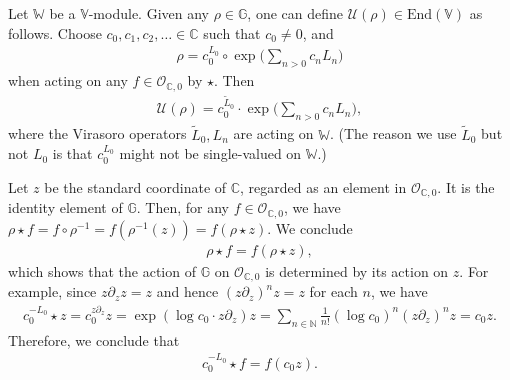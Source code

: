 \documentclass[12pt,b5paper,notitlepage]{report}
\theoremstyle{definition}
\theoremstyle{plain}
\newcommand{\mc}{\mathcal}
\newcommand{\wtd}{\widetilde}
\newcommand{\End}{\mathrm{End}} %
\newcommand{\scr}{\mathscr}
\newcommand{\mbb}{\mathbb}
\newcommand{\blt}{\bullet}
\newcommand{\Vbb}{\mathbb V}
\newcommand{\Wbb}{\mathbb W}
\newcommand{\Gbb}{\mathbb G}
\newcommand{\Cbb}{\mathbb C}
\newcommand{\Nbb}{\mathbb N}
\numberwithin{equation}{section}
\begin{document}
Let $\Wbb$ be a $\Vbb$-module. Given any $\rho\in\Gbb$, one can define $\mc U(\rho)\in\End(\Vbb)$ as follows. \index{U@$\mc U(\rho),\mc U(\eta_\blt)$} Choose $c_0,c_1,c_2,\dots\in\Cbb$ such that $c_0\neq 0$, and 
\begin{align}
\rho=c_0^{L_0}\circ \exp\Big(\sum_{n>0}c_n L_n\Big)\label{eq43}
\end{align}
when acting on any $f\in\scr O_{\Cbb,0}$ by $\star$. Then 
\begin{align}
\mc U(\rho)=c_0^{\wtd L_0}\cdot \exp\Big(\sum_{n>0}c_n L_n\Big),\label{eq46}
\end{align}
where the Virasoro operators $\wtd L_0,L_n$ are acting on $\Wbb$. (The reason we use $\wtd L_0$ but not $L_0$ is that $c_0^{L_0}$ might not be single-valued on $\Wbb$.) 

Let $z$ be the standard coordinate of $\mbb C$, regarded as an element in $\scr O_{\Cbb,0}$. It is the identity element of $\Gbb$. Then, for any $f\in\scr O_{\Cbb,0}$, we have $\rho\star f=f\circ\rho^{-1}=f(\rho^{-1}(z))=f(\rho\star z)$. We conclude
\begin{align}
\rho\star f=f(\rho\star z),\label{eq44}
\end{align}
which shows that the action of $\Gbb$ on $\scr O_{\Cbb,0}$ is determined by its action on $z$. For example, since $z\partial_z z=z$ and hence $(z\partial_z)^nz=z$ for each $n$, we have
\begin{align*}
c_0^{-L_0}\star z=c_0^{z\partial_z}z=\exp(\log c_0\cdot z\partial_z)z=\sum_{n\in\Nbb}\frac 1{n!}(\log c_0)^n(z\partial_z)^n z=c_0z.
\end{align*}
Therefore, we conclude that
\begin{align}
c_0^{-L_0}\star f=f(c_0z).
\end{align}
\end{document}
